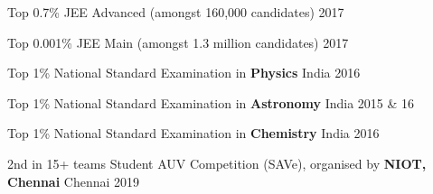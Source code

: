 \begin{cvhonors}

  \cvhonor
  {Top 0.7\%}
  {JEE Advanced (amongst 160,000 candidates)}
  {}
  {2017}

  \cvhonor
  {Top 0.001\%}
  {JEE Main (amongst 1.3 million candidates)}
  {}
  {2017}
  
  \cvhonor
  {Top 1\%} 
  {National Standard Examination in \textbf{Physics}}
  {India}
  {2016}
 
  \cvhonor
  {Top 1\%} 
  {National Standard Examination in \textbf{Astronomy}}
  {India}
  {2015 \& 16}
  
  \cvhonor
  {Top 1\%} 
  {National Standard Examination in \textbf{Chemistry}}
  {India}
  {2016}

  \cvhonor
    {2nd in 15+ teams}
    {Student AUV Competition (SAVe), \break organised by\textbf{ NIOT, Chennai}} 
    {Chennai} 
    {2019}
 
\end{cvhonors}

